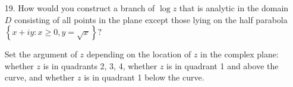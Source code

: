 \documentclass{article}
\begin{document}
\begin{itemize}
	\item[19.] How would you construct a branch of $\log z$ that is analytic in the domain $D$ consisting of all points in the plane except those lying on the half parabola $\left\{ x+iy: x\ge 0, y=\sqrt{x} \right\}?$
		\begin{answer*}
			Set the argument of $z$ depending on the location of $z$ in the complex plane: whether $z$ is in quadrants 2, 3, 4, whether $z$ is in quadrant 1 and above the curve, and whether $z$ is in quadrant 1 below the curve.
		\end{answer*}
		
\end{itemize}
\end{document}
